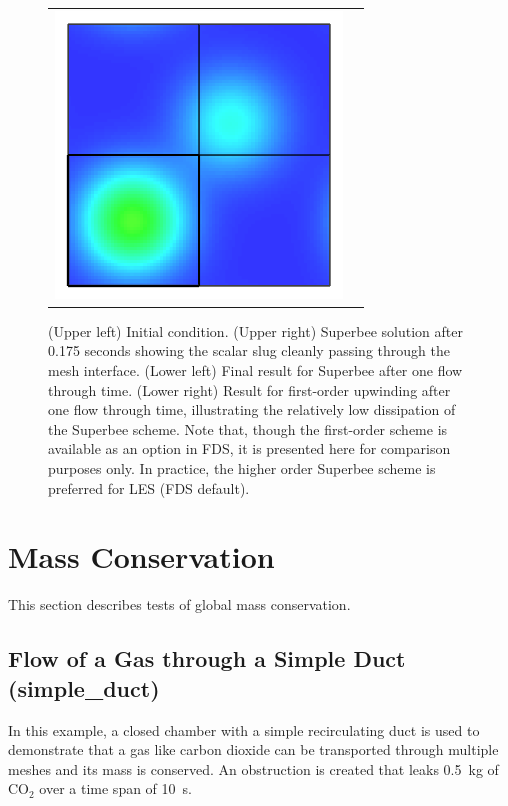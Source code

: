 \documentclass[11pt]{book}
\begin{document}
\begin{figure}[t]
\begin{tabular}{rl}
      \includegraphics[width=3in]{SCRIPT_FIGURES/move_slug_FL1_tf.png} \\
   \end{tabular}
   \caption[Multi-mesh square wave transport]{(Upper left) Initial condition. (Upper right) Superbee solution after 0.175 seconds showing the scalar slug cleanly passing through the mesh interface. (Lower left) Final result for Superbee after one flow through time.  (Lower right) Result for first-order upwinding after one flow through time, illustrating the relatively low dissipation of the Superbee scheme.  Note that, though the first-order scheme is available as an option in FDS, it is presented here for comparison purposes only.  In practice, the higher order Superbee scheme is preferred for LES (FDS default).}
   \label{fig_move_slug}
\end{figure}


\clearpage

\section{Mass Conservation}

This section describes tests of global mass conservation.

\subsection{Flow of a Gas through a Simple Duct (\texorpdfstring{{\bf simple\_duct}}{simple\_duct})}

In this example, a closed chamber with a simple recirculating duct is used to demonstrate that a gas like carbon dioxide can be transported
through multiple meshes and its mass is conserved. An obstruction is created that leaks 0.5~kg of CO$_2$ over a time span of 10~s.
\end{document}
